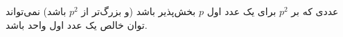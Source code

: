عددی که بر $p^2$ برای یک عدد اول $p$ بخش‌پذیر باشد (و بزرگ‌تر از $p^2$ باشد) نمی‌تواند توان خالص یک عدد اول واحد باشد.